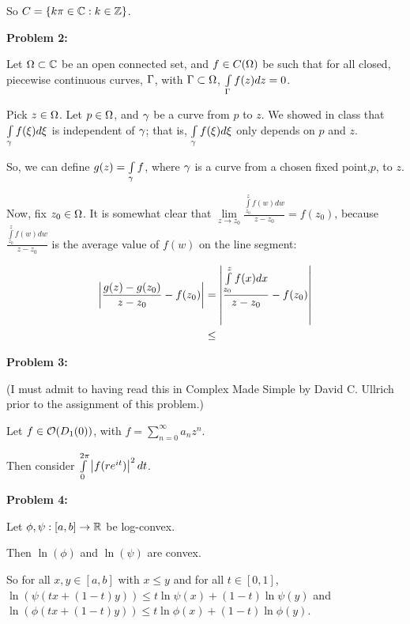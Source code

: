 \documentclass[a4paper,12pt]{article}
\begin{document}
So $C = \{k\pi  \in \mathbb{C}: k \in \mathbb{Z}\}$.

\shunt

{\bf Problem 2:}

Let $\Omega \subset \mathbb{C}$ be an open connected set, and $f \in C(\Omega)$ be such that for all closed, piecewise continuous curves, $\Gamma$, with $\Gamma \subset \Omega$, $\int\limits_\Gamma f(z) dz = 0$.

Pick $z \in \Omega$. Let $p \in \Omega$, and $\gamma$ be a curve from $p$ to $z$. We showed in class that $\int\limits_\gamma f(\xi) d\xi$ is independent of $\gamma$; that is, $\int\limits_\gamma f(\xi) d\xi$ only depends on $p$ and $z$.

So, we can define $g(z) = \int\limits_\gamma f$, where $\gamma$ is a curve from a chosen fixed point,$p$, to $z$.

Now, fix $z_0 \in \Omega$. It is somewhat clear that $\lim\limits_{z\to z_0} \frac{\int\limits_{z_0}^z f(w) dw}{z-z_0} = f(z_0)$, because $ \frac{\int\limits_{z_0}^z f(w) dw}{z-z_0}$ is the average value of $f(w)$ on the line segment: %

\begin{align*}
\left\lvert \frac{g(z)-g(z_0)}{z-z_0} -f(z_0) \right\rvert &= \left\lvert \frac{\int\limits_{z_0}^z f(x) dx}{z-z_0} -f(z_0) \right\rvert\\
&\leq \\
\end{align*}



\shunt

{\bf Problem 3:}

(I must admit to having read this in Complex Made Simple by David C. Ullrich prior to the assignment of this problem.)

Let $f \in \mathcal{O}(D_1(0))$, with $f = \sum\limits_{n=0}^\infty a_nz^n$.

Then consider $\int\limits_0^{2\pi} \left\lvert f(re^{it}) \right\rvert^2 dt$. %

\shunt

{\bf Problem 4:}

Let $\phi, \psi : [a,b] \to \mathbb{R}$ be log-convex.

Then $\ln(\phi)$ and $\ln(\psi)$ are convex.

So for all $x,y \in [a,b]$ with $x \leq y$ and for all $t \in [0,1]$, $\ln(\psi(tx+(1-t)y)) \leq t\ln\psi(x) + (1-t)\ln\psi(y)$ and $\ln(\phi(tx+(1-t)y)) \leq t\ln\phi(x) + (1-t)\ln\phi(y)$.
\end{document}
